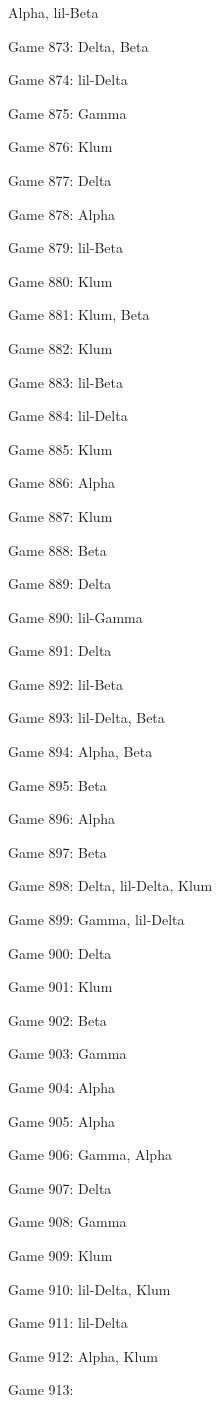 \documentclass{article}
\begin{document}
\begin{multicols}{3}
\begin{compactitem}
Alpha, lil-Beta
\item Game 873:
Delta, Beta
\item Game 874:
lil-Delta
\item Game 875:
Gamma
\item Game 876:
Klum
\item Game 877:
Delta
\item Game 878:
Alpha
\item Game 879:
lil-Beta
\item Game 880:
Klum
\item Game 881:
Klum, Beta
\item Game 882:
Klum
\item Game 883:
lil-Beta
\item Game 884:
lil-Delta
\item Game 885:
Klum
\item Game 886:
Alpha
\item Game 887:
Klum
\item Game 888:
Beta
\item Game 889:
Delta
\item Game 890:
lil-Gamma
\item Game 891:
Delta
\item Game 892:
lil-Beta
\item Game 893:
lil-Delta, Beta
\item Game 894:
Alpha, Beta
\item Game 895:
Beta
\item Game 896:
Alpha
\item Game 897:
Beta
\item Game 898:
Delta, lil-Delta, Klum
\item Game 899:
Gamma, lil-Delta
\item Game 900:
Delta
\item Game 901:
Klum
\item Game 902:
Beta
\item Game 903:
Gamma
\item Game 904:
Alpha
\item Game 905:
Alpha
\item Game 906:
Gamma, Alpha
\item Game 907:
Delta
\item Game 908:
Gamma
\item Game 909:
Klum
\item Game 910:
lil-Delta, Klum
\item Game 911:
lil-Delta
\item Game 912:
Alpha, Klum
\item Game 913:

\end{compactitem}
\end{multicols}
\end{document}
